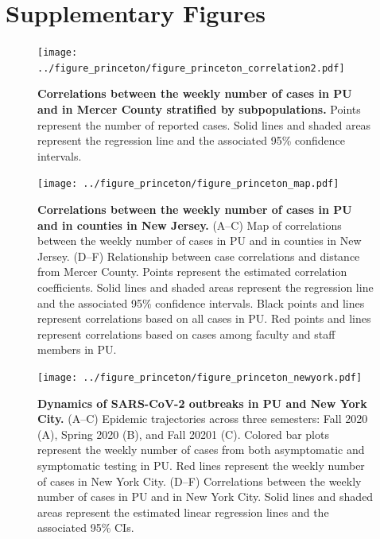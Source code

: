 \documentclass[12pt]{article}
\begin{document}


\pagebreak

\section*{Supplementary Figures}

\renewcommand{\thefigure}{S\arabic{figure}}
\setcounter{figure}{0}

\begin{figure}[!htp]
\texttt{[image: ../figure\_princeton/figure\_princeton\_correlation2.pdf]}
\caption{
\textbf{Correlations between the weekly number of cases in PU and in Mercer County stratified by subpopulations.}
Points represent the number of reported cases.
Solid lines and shaded areas represent the regression line and the associated 95\% confidence intervals.
}
\end{figure}

\pagebreak


\begin{figure}[!htp]
\begin{center}
\texttt{[image: ../figure\_princeton/figure\_princeton\_map.pdf]}
\end{center}
\caption{
\textbf{Correlations between the weekly number of cases in PU and in counties in New Jersey.}
(A--C) Map of correlations between the weekly number of cases in PU and in counties in New Jersey.
(D--F) Relationship between case correlations and distance from Mercer County.
Points represent the estimated correlation coefficients.
Solid lines and shaded areas represent the regression line and the associated 95\% confidence intervals.
Black points and lines represent correlations based on all cases in PU.
Red points and lines represent correlations based on cases among faculty and staff members in PU.
}
\end{figure}


\pagebreak

\begin{figure}[!htp]
\texttt{[image: ../figure\_princeton/figure\_princeton\_newyork.pdf]}
\caption{
\textbf{Dynamics of SARS-CoV-2 outbreaks in PU and New York City.}
(A--C) Epidemic trajectories across three semesters: Fall 2020 (A), Spring 2020 (B), and Fall 20201 (C).
Colored bar plots represent the weekly number of cases from both asymptomatic and symptomatic testing in PU.
Red lines represent the weekly number of cases in New York City.
(D--F) Correlations between the weekly number of cases in PU and in New York City.
Solid lines and shaded areas represent the estimated linear regression lines and the associated 95\% CIs.
}
\end{figure}
\end{document}
